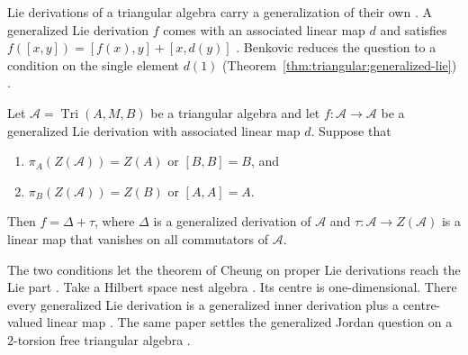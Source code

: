 Lie derivations of a triangular algebra carry a generalization of their own
\cite[p.~1535]{Benkovic2011GenLie}. A generalized Lie derivation $f$ comes
with an associated linear map $d$ and satisfies $f([x,y])=[f(x),y]+[x,d(y)]$
\cite[p.~1535]{Benkovic2011GenLie}. Benkovic reduces the question to a
condition on the single element $d(1)$
(Theorem~\ref{thm:triangular:generalized-lie})
\cite[p.~1539]{Benkovic2011GenLie}.\begin{theorem}\label{thm:triangular:generalized-lie} Let
$\mathcal{A}=\operatorname{Tri}(A,M,B)$ be a triangular algebra and let
$f\colon\mathcal{A}\to\mathcal{A}$ be a generalized Lie derivation with
associated linear map $d$. Suppose that \begin{enumerate} \item
$\pi_A(Z(\mathcal{A}))=Z(A)$ or $[B,B]=B$, and \item
$\pi_B(Z(\mathcal{A}))=Z(B)$ or $[A,A]=A$. \end{enumerate} Then
$f=\Delta+\tau$, where $\Delta$ is a generalized derivation of $\mathcal{A}$
and $\tau\colon\mathcal{A}\to Z(\mathcal{A})$ is a linear map that vanishes on
all commutators of $\mathcal{A}$. \end{theorem}

The two conditions let the theorem of Cheung on proper Lie derivations reach
the Lie part \cite[p.~1541]{Benkovic2011GenLie}. Take a Hilbert space nest
algebra \cite[p.~1541]{Benkovic2011GenLie}. Its centre is one-dimensional.
There every generalized Lie derivation
is a generalized inner derivation plus a centre-valued linear map
\cite[Corollary~3.8, p.~1541]{Benkovic2011GenLie}. The same paper settles the
generalized Jordan question on a $2$-torsion free triangular algebra
\cite[Theorem~4.2, p.~1542]{Benkovic2011GenLie}.

